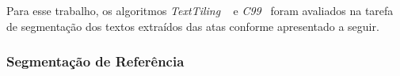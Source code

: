 Para esse trabalho, os algoritmos \textit{TextTiling} ~\cite{Hearst1994} e \textit{C99}~\cite{Choi2000} foram avaliados na tarefa de segmentação dos textos extraídos das atas conforme apresentado a seguir.


% 
















\subsubsection{Segmentação de Referência}
	 \label{subsubsec:segmetacaoreferencia}

